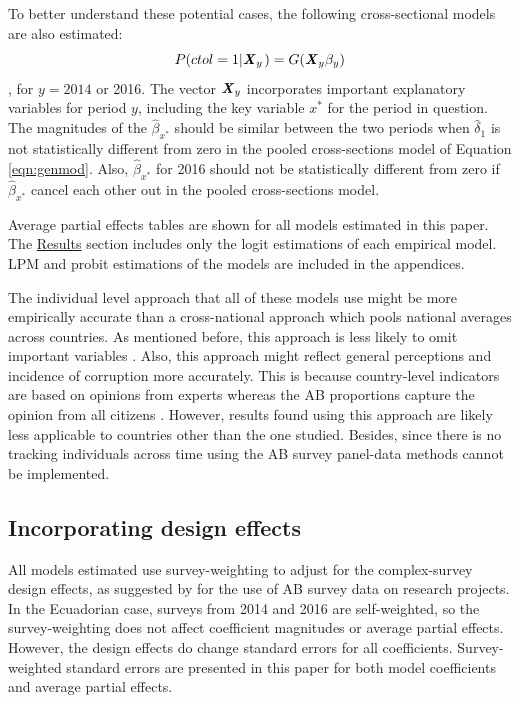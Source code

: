 \documentclass[floatsintext,man]{apa7}\usepackage[]{graphicx}\usepackage[]{color}
\begin{document}
To better understand these potential cases, the following cross-sectional models are also estimated:
\begin{equation}
\label{eqn:crosssecmodel}
P(ctol = 1 | \textbf{\textit{X}}_y \hspace{0.04cm}) = G (\textbf{\textit{X}}_y \beta_y )
\end{equation}
, for $y=2014$ or 2016. The vector $\textbf{\textit{X}}_y$ incorporates important explanatory variables for period $y$, including the key variable $x^*$ for the period in question. The magnitudes of the $\hat{\beta}_{x^*}$ should be similar between the two periods when $\hat{\delta}_1$ is not statistically different from zero in the pooled cross-sections model of Equation \ref{eqn:genmod}. Also, $\hat{\beta}_{x^*}$ for 2016 should not be statistically different from zero if $\hat{\beta}_{x^*}$ cancel each other out in the pooled cross-sections model. 

Average partial effects tables are shown for all models estimated in this paper. The \hyperref[sec:findings]{Results} section includes only the logit estimations of each empirical model. LPM and probit estimations of the models are included in the appendices. 

The individual level approach that all of these models use might be more empirically accurate than a cross-national approach which pools national averages across countries. As mentioned before, this approach is less likely to omit important variables \parencite{Bergh.2017}. Also, this approach might reflect general perceptions and incidence of corruption more accurately. This is because country-level indicators are based on opinions from experts whereas the AB proportions capture the opinion from all citizens \parencite{Morris.2008}. However, results found using this approach are likely less applicable to countries other than the one studied. Besides, since there is no tracking individuals across time using the AB survey panel-data methods cannot be implemented. 

\subsection{Incorporating design effects}
All models estimated use survey-weighting to adjust for the complex-survey design effects, as suggested by \textcite{Castorena.2021} for the use of AB survey data on research projects. In the Ecuadorian case, surveys from 2014 and 2016 are self-weighted, so the survey-weighting does not affect coefficient magnitudes or average partial effects. However, the design effects do change standard errors for all coefficients. Survey-weighted standard errors are presented in this paper for both model coefficients and average partial effects. 
\end{document}
